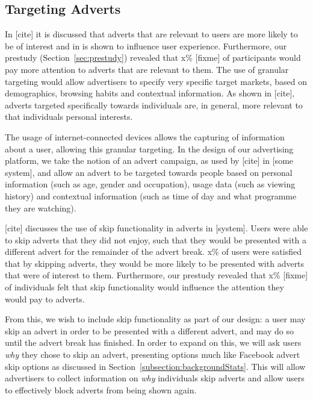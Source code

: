 \subsection{Targeting Adverts}
\label{sec:design_adverts}

In [cite] it is discussed that adverts that are relevant to users are more likely to be of interest and in \citet{yahoo-intrusive-advertising} is shown to influence user experience. Furthermore, our prestudy (Section~\ref{sec:prestudy}) revealed that x\% [fixme] of participants would pay more attention to adverts that are relevant to them. The use of granular targeting would allow advertisers to specify very specific target markets, based on demographics, browsing habits and contextual information. As shown in [cite], adverts targeted specifically towards individuals are, in general, more relevant to that individuals personal interests.

The usage of internet-connected devices allows the capturing of information about a user, allowing this granular targeting. In the design of our advertising platform, we take the notion of an advert campaign, as used by [cite] in [some system], and allow an advert to be targeted towards people based on personal information (such as age, gender and occupation), usage data (such as viewing history) and contextual information (such as time of day and what programme they are watching).

[cite] discusses the use of skip functionality in adverts in [system]. Users were able to skip adverts that they did not enjoy, such that they would be presented with a different advert for the remainder of the advert break. x\% of users were satisfied that by skipping adverts, they would be more likely to be presented with adverts that were of interest to them. Furthermore, our prestudy revealed that x\% [fixme] of individuals felt that skip functionality would influence the attention they would pay to adverts. 

From this, we wish to include skip functionality as part of our design: a user may skip an advert in order to be presented with a different advert, and may do so until the advert break has finished. In order to expand on this, we will ask users \textit{why} they chose to skip an advert, presenting options much like Facebook advert skip options as discussed in Section~\ref{subsection:backgroundStats}. This will allow advertisers to collect information on \textit{why} individuals skip adverts and allow users to effectively block adverts from being shown again. 

